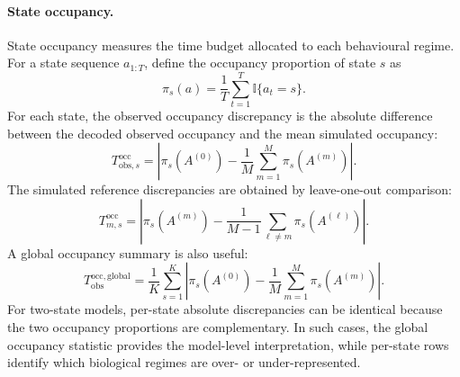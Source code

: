 \documentclass[11pt]{article}
\newcommand{\ind}{\mathbb{I}}
\begin{document}
\paragraph{State occupancy.}
State occupancy measures the time budget allocated to each behavioural regime.
For a state sequence $a_{1:T}$, define the occupancy proportion of state $s$ as
\begin{equation*}
  \pi_s(a)
  =
  \frac{1}{T}\sum_{t=1}^{T}\ind\{a_t=s\}.
\end{equation*}
For each state, the observed occupancy discrepancy is the absolute difference
between the decoded observed occupancy and the mean simulated occupancy:
\begin{equation*}
  T_{\mathrm{obs},s}^{\mathrm{occ}}
  =
  \left|
    \pi_s(A^{(0)})
    -
    \frac{1}{M}\sum_{m=1}^{M}\pi_s(A^{(m)})
  \right|.
\end{equation*}
The simulated reference discrepancies are obtained by leave-one-out comparison:
\begin{equation*}
  T_{m,s}^{\mathrm{occ}}
  =
  \left|
    \pi_s(A^{(m)})
    -
    \frac{1}{M-1}\sum_{\ell \ne m}\pi_s(A^{(\ell)})
  \right|.
\end{equation*}
A global occupancy summary is also useful:
\begin{equation*}
  T_{\mathrm{obs}}^{\mathrm{occ,global}}
  =
  \frac{1}{K}
  \sum_{s=1}^{K}
  \left|
    \pi_s(A^{(0)})
    -
    \frac{1}{M}\sum_{m=1}^{M}\pi_s(A^{(m)})
  \right|.
\end{equation*}
For two-state models, per-state absolute discrepancies can be identical because
the two occupancy proportions are complementary. In such cases, the global
occupancy statistic provides the model-level interpretation, while per-state
rows identify which biological regimes are over- or under-represented.
\end{document}
